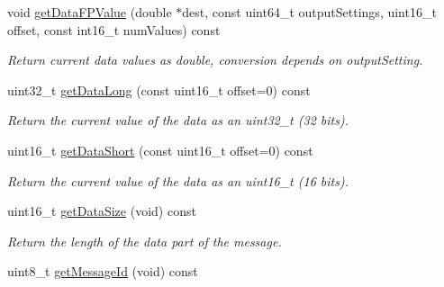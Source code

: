\begin{DoxyCompactItemize}
void \hyperlink{classxsens_1_1Message_a7357d3c499b1248cf97e68d3fc55788a}{get\-Data\-F\-P\-Value} (double $\ast$dest, const uint64\-\_\-t output\-Settings, uint16\-\_\-t offset, const int16\-\_\-t num\-Values) const 
\begin{DoxyCompactList}\small\item\em \-Return current data values as double, conversion depends on output\-Setting. \end{DoxyCompactList}\item 
uint32\-\_\-t \hyperlink{classxsens_1_1Message_a03dd345aaac6f10b9c353141158aaf4d}{get\-Data\-Long} (const uint16\-\_\-t offset=0) const 
\begin{DoxyCompactList}\small\item\em \-Return the current value of the data as an uint32\-\_\-t (32 bits). \end{DoxyCompactList}\item 
uint16\-\_\-t \hyperlink{classxsens_1_1Message_a860a7374c4be094df55599558cd0c0fe}{get\-Data\-Short} (const uint16\-\_\-t offset=0) const 
\begin{DoxyCompactList}\small\item\em \-Return the current value of the data as an uint16\-\_\-t (16 bits). \end{DoxyCompactList}\item 
\hypertarget{classxsens_1_1Message_aeb572e04ffd74bced1f6d9ba82376274}{uint16\-\_\-t \hyperlink{classxsens_1_1Message_aeb572e04ffd74bced1f6d9ba82376274}{get\-Data\-Size} (void) const }\label{classxsens_1_1Message_aeb572e04ffd74bced1f6d9ba82376274}

\begin{DoxyCompactList}\small\item\em \-Return the length of the data part of the message. \end{DoxyCompactList}\item 
\hypertarget{classxsens_1_1Message_a2858b866e804d9881d331878c3f9a242}{uint8\-\_\-t \hyperlink{classxsens_1_1Message_a2858b866e804d9881d331878c3f9a242}{get\-Message\-Id} (void) const }\label{classxsens_1_1Message_a2858b866e804d9881d331878c3f9a242}


\end{DoxyCompactItemize}
